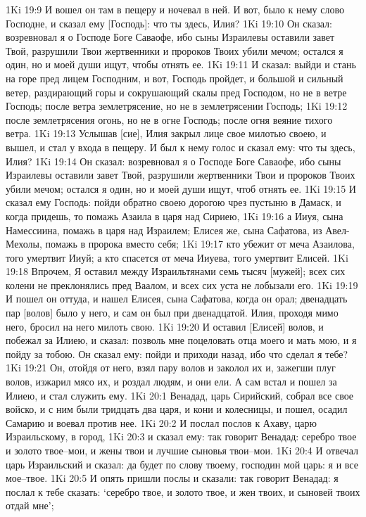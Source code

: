 1Ki 19:9  И вошел он там в пещеру и ночевал в ней. И вот, было к нему слово Господне, и сказал ему [Господь]: что ты здесь, Илия?
1Ki 19:10  Он сказал: возревновал я о Господе Боге Саваофе, ибо сыны Израилевы оставили завет Твой, разрушили Твои жертвенники и пророков Твоих убили мечом; остался я один, но и моей души ищут, чтобы отнять ее.
1Ki 19:11  И сказал: выйди и стань на горе пред лицем Господним, и вот, Господь пройдет, и большой и сильный ветер, раздирающий горы и сокрушающий скалы пред Господом, но не в ветре Господь; после ветра землетрясение, но не в землетрясении Господь;
1Ki 19:12  после землетрясения огонь, но не в огне Господь; после огня веяние тихого ветра.
1Ki 19:13  Услышав [сие], Илия закрыл лице свое милотью своею, и вышел, и стал у входа в пещеру. И был к нему голос и сказал ему: что ты здесь, Илия?
1Ki 19:14  Он сказал: возревновал я о Господе Боге Саваофе, ибо сыны Израилевы оставили завет Твой, разрушили жертвенники Твои и пророков Твоих убили мечом; остался я один, но и моей души ищут, чтоб отнять ее.
1Ki 19:15  И сказал ему Господь: пойди обратно своею дорогою чрез пустыню в Дамаск, и когда придешь, то помажь Азаила в царя над Сириею,
1Ki 19:16  а Ииуя, сына Намессиина, помажь в царя над Израилем; Елисея же, сына Сафатова, из Авел-Мехолы, помажь в пророка вместо себя;
1Ki 19:17  кто убежит от меча Азаилова, того умертвит Ииуй; а кто спасется от меча Ииуева, того умертвит Елисей.
1Ki 19:18  Впрочем, Я оставил между Израильтянами семь тысяч [мужей]; всех сих колени не преклонялись пред Ваалом, и всех сих уста не лобызали его.
1Ki 19:19  И пошел он оттуда, и нашел Елисея, сына Сафатова, когда он орал; двенадцать пар [волов] было у него, и сам он был при двенадцатой. Илия, проходя мимо него, бросил на него милоть свою.
1Ki 19:20  И оставил [Елисей] волов, и побежал за Илиею, и сказал: позволь мне поцеловать отца моего и мать мою, и я пойду за тобою. Он сказал ему: пойди и приходи назад, ибо что сделал я тебе?
1Ki 19:21  Он, отойдя от него, взял пару волов и заколол их и, зажегши плуг волов, изжарил мясо их, и роздал людям, и они ели. А сам встал и пошел за Илиею, и стал служить ему.
1Ki 20:1  Венадад, царь Сирийский, собрал все свое войско, и с ним были тридцать два царя, и кони и колесницы, и пошел, осадил Самарию и воевал против нее.
1Ki 20:2  И послал послов к Ахаву, царю Израильскому, в город,
1Ki 20:3  и сказал ему: так говорит Венадад: серебро твое и золото твое--мои, и жены твои и лучшие сыновья твои--мои.
1Ki 20:4  И отвечал царь Израильский и сказал: да будет по слову твоему, господин мой царь: я и все мое--твое.
1Ki 20:5  И опять пришли послы и сказали: так говорит Венадад: я послал к тебе сказать: `серебро твое, и золото твое, и жен твоих, и сыновей твоих отдай мне';
